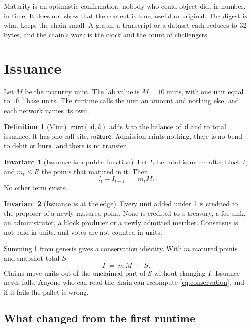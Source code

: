 \documentclass[11pt,a4paper]{article}
\theoremstyle{definition}
\newtheorem{definition}{Definition}[section]
\newtheorem{invariant}{Invariant}[section]
\theoremstyle{plain}
\theoremstyle{remark}
\newcommand{\id}{\mathsf{id}}
\begin{document}
Maturity is an optimistic confirmation: nobody who could object did, in number, in time. It does not show that the content is true, useful or original. The digest is what keeps the chain small. A graph, a transcript or a dataset each reduces to 32 bytes, and the chain's work is the clock and the count of challengers.

\section{Issuance}
\label{sec:issuance}

Let $M$ be the maturity mint. The lab value is $M = 10$ units, with one unit equal to $10^{12}$ base units. The runtime calls the unit an amount and nothing else, and each network names its own.

\begin{definition}[Mint]
$\mathsf{mint}(\id, k)$ adds $k$ to the balance of $\id$ and to total issuance. It has one call site, $\mathsf{mature}$. Admission mints nothing, there is no bond to debit or burn, and there is no transfer.
\end{definition}

\begin{invariant}[Issuance is a public function]
\label{inv:issuance}
Let $I_t$ be total issuance after block $t$, and $m_t \le R$ the points that matured in it. Then
\[
  I_t - I_{t-1} \;=\; m_t M .
\]
No other term exists.
\end{invariant}

\begin{invariant}[Issuance is at the edge]
\label{inv:edge}
Every unit added under \cref{inv:issuance} is credited to the proposer of a newly matured point. None is credited to a treasury, a fee sink, an administrator, a block producer or a newly admitted member. Consensus is not paid in units, and votes are not counted in units.
\end{invariant}

Summing \cref{inv:issuance} from genesis gives a conservation identity. With $m$ matured points and snapshot total $S$,
\begin{equation}
\label{eq:conservation}
  I \;=\; m\,M \;+\; S .
\end{equation}
Claims move units out of the unclaimed part of $S$ without changing $I$. Issuance never falls. Anyone who can read the chain can recompute \cref{eq:conservation}, and if it fails the pallet is wrong.

\subsection{What changed from the first runtime}
\label{sec:noadmission}
\end{document}

